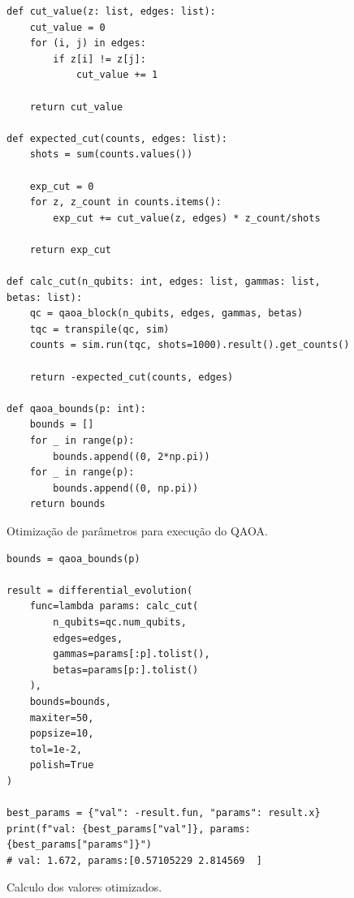 \begin{figure}[!ht]
\centering
\begin{minipage}{1\textwidth}
\begin{lstlisting}[style=pythonstyle, firstnumber=52]
def cut_value(z: list, edges: list):
    cut_value = 0
    for (i, j) in edges:
        if z[i] != z[j]:
            cut_value += 1

    return cut_value

def expected_cut(counts, edges: list):
    shots = sum(counts.values())

    exp_cut = 0
    for z, z_count in counts.items():
        exp_cut += cut_value(z, edges) * z_count/shots

    return exp_cut

def calc_cut(n_qubits: int, edges: list, gammas: list, betas: list):
    qc = qaoa_block(n_qubits, edges, gammas, betas)
    tqc = transpile(qc, sim)
    counts = sim.run(tqc, shots=1000).result().get_counts()

    return -expected_cut(counts, edges)

def qaoa_bounds(p: int):
    bounds = []
    for _ in range(p):
        bounds.append((0, 2*np.pi))
    for _ in range(p):
        bounds.append((0, np.pi))
    return bounds
\end{lstlisting}
\end{minipage}
\caption{Otimização de parâmetros para execução do QAOA.}
\label{fig:qaoaparams}
\end{figure}

\begin{figure}[!ht]
\centering
\begin{minipage}{1\textwidth}
\begin{lstlisting}[style=pythonstyle, firstnumber=84]
bounds = qaoa_bounds(p)

result = differential_evolution(
    func=lambda params: calc_cut(
        n_qubits=qc.num_qubits,
        edges=edges,
        gammas=params[:p].tolist(),
        betas=params[p:].tolist()
    ),
    bounds=bounds,
    maxiter=50,
    popsize=10,
    tol=1e-2,
    polish=True
)

best_params = {"val": -result.fun, "params": result.x}
print(f"val: {best_params["val"]}, params:{best_params["params"]}")
# val: 1.672, params:[0.57105229 2.814569  ]
\end{lstlisting}
\end{minipage}
\caption{Calculo dos valores otimizados.}
\label{fig:qaoaparams2}
\end{figure}

